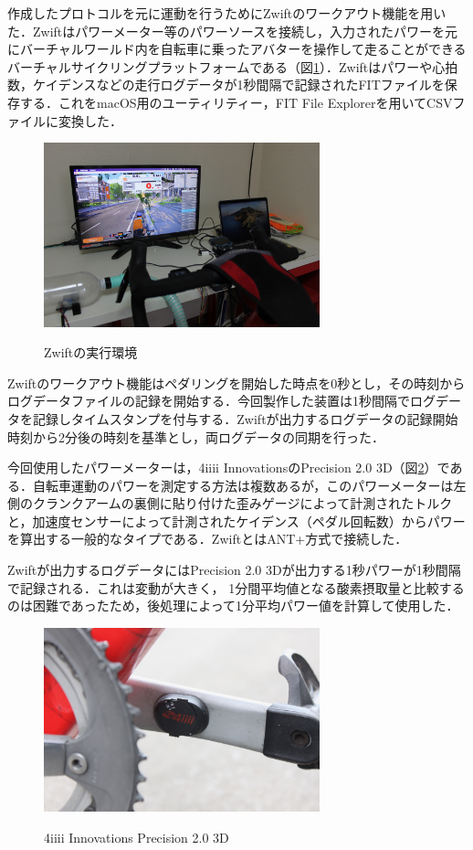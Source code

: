 作成したプロトコルを元に運動を行うためにZwiftのワークアウト機能を用いた．Zwiftはパワーメーター等のパワーソースを接続し，入力されたパワーを元にバーチャルワールド内を自転車に乗ったアバターを操作して走ることができるバーチャルサイクリングプラットフォームである（図\ref{fig:zwift}）．Zwiftはパワーや心拍数，ケイデンスなどの走行ログデータが1秒間隔で記録されたFITファイルを保存する．これをmacOS用のユーティリティー，FIT File Explorer\cite{fitfile}を用いてCSVファイルに変換した．

\begin{figure}[h]
  \begin{center}
    \label{fig:zwift}
    \includegraphics[width=8cm]{fig/zwift}
    \caption{Zwiftの実行環境}
  \end{center}
\end{figure}

Zwiftのワークアウト機能はペダリングを開始した時点を0秒とし，その時刻からログデータファイルの記録を開始する．今回製作した装置は1秒間隔でログデータを記録しタイムスタンプを付与する．Zwiftが出力するログデータの記録開始時刻から2分後の時刻を基準とし，両ログデータの同期を行った．

今回使用したパワーメーターは，4iiii InnovationsのPrecision 2.0 3D（図\ref{fig:4iiii}）である．自転車運動のパワーを測定する方法は複数あるが，このパワーメーターは左側のクランクアームの裏側に貼り付けた歪みゲージによって計測されたトルクと，加速度センサーによって計測されたケイデンス（ペダル回転数）からパワーを算出する一般的なタイプである．ZwiftとはANT+方式で接続した．

Zwiftが出力するログデータにはPrecision 2.0 3Dが出力する1秒パワーが1秒間隔で記録される．これは変動が大きく， 1分間平均値となる酸素摂取量と比較するのは困難であったため，後処理によって1分平均パワー値を計算して使用した．

\begin{figure}[h]
  \begin{center}
    \label{fig:4iiii}
    \includegraphics[width=8cm]{fig/4iiii}
    \caption{4iiii Innovations Precision 2.0 3D}
  \end{center}
\end{figure}

